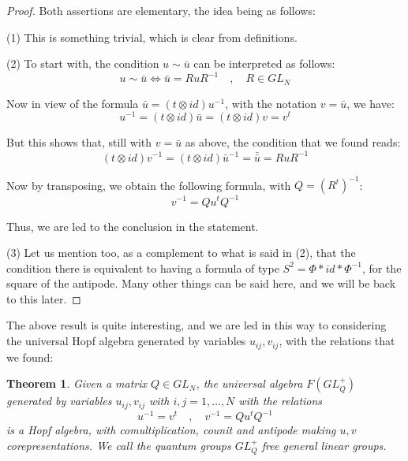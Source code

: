 \documentclass[12pt]{amsbook}
\newtheorem{theorem}{Theorem}[chapter]
\begin{document}
\begin{proof}
Both assertions are elementary, the idea being as follows:

\medskip

(1) This is something trivial, which is clear from definitions.

\medskip

(2) To start with, the condition $u\sim\bar{u}$ can be interpreted as follows:
$$u\sim\bar{u}\iff \bar{u}=RuR^{-1}\quad,\quad R\in GL_N$$

Now in view of the formula $\bar{u}=(t\otimes id)u^{-1}$, with the notation $v=\bar{u}$, we have:
$$u^{-1}=(t\otimes id)\bar{u}=(t\otimes id)v=v^t$$

But this shows that, still with $v=\bar{u}$ as above, the condition that we found reads:
$$(t\otimes id)v^{-1}
=(t\otimes id)\bar{u}^{-1}
=\bar{\bar{u}}
=RuR^{-1}$$

Now by transposing, we obtain the following formula, with $Q=(R^t)^{-1}$:
$$v^{-1}=Qu^tQ^{-1}$$

Thus, we are led to the conclusion in the statement.

\medskip

(3) Let us mention too, as a complement to what is said in (2), that the condition there is equivalent to having a formula of type $S^2=\Phi*id*\Phi^{-1}$, for the square of the antipode. Many other things can be said here, and we will be back to this later.
\end{proof}

The above result is quite interesting, and we are led in this way to considering the universal Hopf algebra generated by variables $u_{ij},v_{ij}$, with the relations that we found:

\begin{theorem}
Given a matrix $Q\in GL_N$, the universal algebra $F(GL_Q^+)$ generated by variables $u_{ij},v_{ij}$ with $i,j=1,\ldots,N$ with the relations
$$u^{-1}=v^t\quad,\quad v^{-1}=Qu^tQ^{-1}$$
is a Hopf algebra, with comultiplication, counit and antipode making $u,v$ corepresentations. We call the quantum groups $GL_Q^+$ free general linear groups.
\end{theorem}
\end{document}
